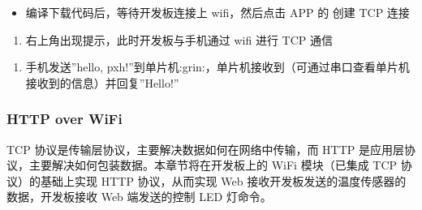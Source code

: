 \documentclass[a4paper,12pt,english]{sphinxmanual}
\begin{document}
\begin{sphinxVerbatim}[commandchars=\\\{\}]

\PYG{p}{[}\PYG{p}{]}
\end{sphinxVerbatim}
\begin{itemize}
\item {} 
\sphinxAtStartPar
编译下载代码后，等待开发板连接上 wifi，然后点击 APP 的  创建 TCP 连接

\end{itemize}
\begin{enumerate}
%
\item {} 
\sphinxAtStartPar
右上角出现提示，此时开发板与手机通过 wifi 进行 TCP 通信

\end{enumerate}


\begin{enumerate}
%
\setcounter{enumi}{1}
\item {} 
\sphinxAtStartPar
手机发送”hello, pxh!”到单片机:grin:，单片机接收到（可通过串口查看单片机接收到的信息）并回复”Hello!”

\end{enumerate}

\sphinxAtStartPar
{}

\sphinxstepscope


\subsubsection{HTTP over WiFi}
\label{\detokenize{exp-stm32/wifi/http-over-wifi:http-over-wifi}}\label{\detokenize{exp-stm32/wifi/http-over-wifi::doc}}
\sphinxAtStartPar
TCP 协议是传输层协议，主要解决数据如何在网络中传输，而 HTTP 是应用层协议，主要解决如何包装数据。本章节将在开发板上的 WiFi 模块（已集成 TCP 协议）的基础上实现 HTTP 协议，从而实现 Web 接收开发板发送的温度传感器的数据，开发板接收 Web 端发送的控制 LED 灯命令。
\end{document}
